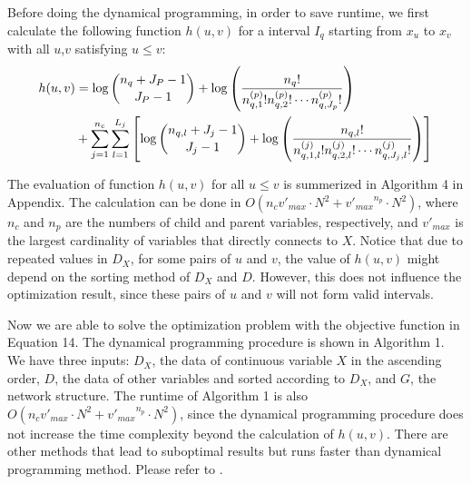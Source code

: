 Before doing the dynamical programming, in order to save runtime, we first calculate the following function $h(u,v)$ for a interval $I_q$ starting from $x_{u}$ to $x_{v}$ with all $u$,$v$ satisfying $u \leq v$:
\begin{equation}
\begin{aligned}
h(u,v) &=  \log {{n_{q} + J_P - 1}\choose{J_P-1}} + \log \left( { {{n_q}!}\over{ {n^{(p)}_{q,1} !} {n^{(p)}_{q,2} !} \cdots {n^{(p)}_{q,J_p} !}} } \right) \\
& + \sum_{j=1}^{n_c} \sum_{l=1}^{L_j} \left[  \log{{n_{q,l} + J_j - 1}\choose{J_j-1}} + \log \left( { {{n_{q,l}}!}\over{ {n^{(j)}_{q,1,l} !} {n^{(j)}_{q,2,l} !} \cdots {n^{(j)}_{q,J_j,l} !}} } \right) \right] 
\end{aligned}
\end{equation}

The evaluation of function $h(u,v)$ for all $u \leq v$ is summerized in Algorithm 4 in Appendix. The calculation can be done in $O(n_c  {v'_{max}} \cdot N^2 + {v'_{max}}^{n_p} \cdot N^2)$, where $n_c$ and $n_p$ are the numbers of child and parent variables, respectively, and $v'_{max}$ is the largest cardinality of variables that directly connects to $X$. Notice that due to repeated values in $D_X$, for some pairs of $u$ and $v$, the value of $h(u,v)$ might depend on the sorting method of $D_X$ and $D$. However, this does not influence the optimization result, since these pairs of $u$ and $v$ will not form valid intervals.

Now we are able to solve the optimization problem with the objective function in Equation 14. The dynamical programming procedure is shown in Algorithm 1. We have three inputs: $D_X$, the data of continuous variable $X$ in the ascending order, $D$, the data of other variables and sorted according to $D_X$, and $G$, the network structure. The runtime of Algorithm 1 is also $O(n_c  {v'_{max}} \cdot N^2 + {v'_{max}}^{n_p} \cdot N^2)$, since the dynamical programming procedure does not increase the time complexity beyond the calculation of $h(u,v)$. There are other methods that lead to suboptimal results but runs faster than dynamical programming method. Please refer to \citep{Boulle_2006}.

